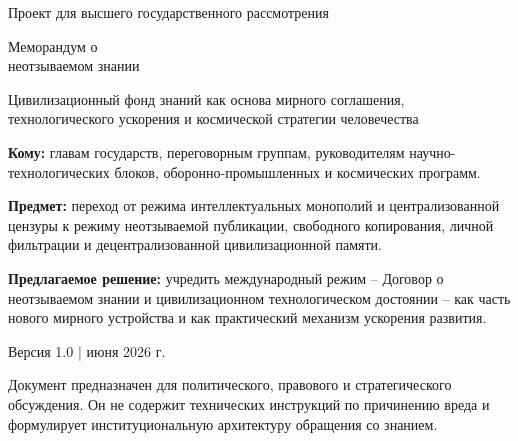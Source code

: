 \documentclass[11pt,a4paper]{article}
\begin{document}
\begin{titlepage}
\thispagestyle{empty}
\vspace*{9mm}
{\sffamily\color{white}\Large Проект для высшего государственного рассмотрения}\par
\vspace{18mm}
{\sffamily\bfseries\color{white}\fontsize{31}{36}\selectfont \begin{minipage}{0.86\textwidth}\raggedright Меморандум о\\неотзываемом знании\end{minipage}}\par
\vspace{6mm}
{\sffamily\color{white}\Large \begin{minipage}{0.88\textwidth}\raggedright Цивилизационный фонд знаний как основа мирного соглашения, технологического ускорения и космической стратегии человечества\end{minipage}}\par
\vspace{22mm}

\begin{decisionbox}
\textbf{Кому:} главам государств, переговорным группам, руководителям научно-технологических блоков, оборонно-промышленных и космических программ.\par
\textbf{Предмет:} переход от режима интеллектуальных монополий и централизованной цензуры к режиму неотзываемой публикации, свободного копирования, личной фильтрации и децентрализованной цивилизационной памяти.\par
\textbf{Предлагаемое решение:} учредить международный режим -- Договор о неотзываемом знании и цивилизационном технологическом достоянии -- как часть нового мирного устройства и как практический механизм ускорения развития.
\end{decisionbox}

\vfill
{\sffamily\color{GrayText}\large Версия 1.0 \quad |  июня 2026 г.}\par
\vspace{2mm}
{\sffamily\color{GrayText}\small Документ предназначен для политического, правового и стратегического обсуждения. Он не содержит технических инструкций по причинению вреда и формулирует институциональную архитектуру обращения со знанием.}\par
\end{titlepage}
\end{document}
